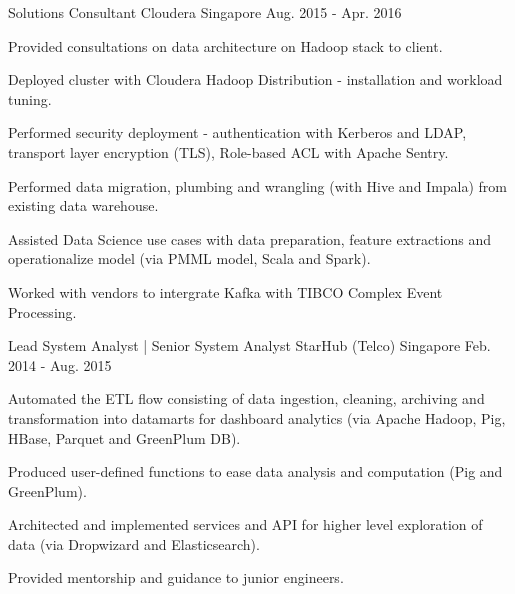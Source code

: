 \begin{cventries}
  \cventry
    {Solutions Consultant} %
    {Cloudera} %
    {Singapore} %
    {Aug. 2015 - Apr. 2016} %
    {
      \begin{cvitems} %
        \item {Provided consultations on data architecture on Hadoop stack to
            client.}
        \item {Deployed cluster with Cloudera Hadoop Distribution - installation
            and workload tuning.}
        \item {Performed security deployment - authentication with Kerberos
            and LDAP, transport layer encryption (TLS), Role-based ACL with
            Apache Sentry.}
        \item {Performed data migration, plumbing and wrangling (with Hive and
            Impala) from existing data warehouse.}
        \item {Assisted Data Science use cases with data preparation, feature
            extractions and operationalize model (via PMML model, Scala and
            Spark).}
        \item {Worked with vendors to intergrate Kafka with TIBCO Complex Event
            Processing.}
      \end{cvitems}
    }

  \cventry
    {Lead System Analyst | Senior System Analyst} %
    {StarHub (Telco)} %
    {Singapore} %
    {Feb. 2014 - Aug. 2015} %
    {
      \begin{cvitems} %
        \item {Automated the ETL flow consisting of data ingestion, cleaning,
            archiving and transformation into datamarts for dashboard analytics
            (via Apache Hadoop, Pig, HBase, Parquet and GreenPlum DB).}
        \item {Produced user-defined functions to ease data analysis and
            computation (Pig and GreenPlum).}
        \item {Architected and implemented services and API for higher level
            exploration of data (via Dropwizard and Elasticsearch).}
        \item {Provided mentorship and guidance to junior engineers.}
      \end{cvitems}
    }


\end{cventries}
